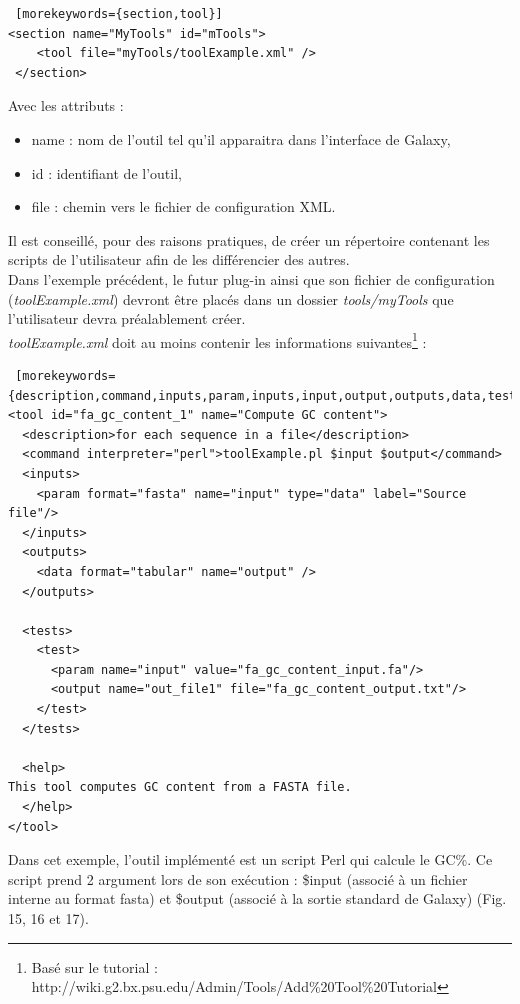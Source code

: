 \lstset{language=XML}
\begin{lstlisting} [morekeywords={section,tool}]
<section name="MyTools" id="mTools">
    <tool file="myTools/toolExample.xml" />
 </section>
 \end{lstlisting} 
 
Avec les attributs : 
\begin{itemize}
\item name : nom de l'outil tel qu'il apparaitra dans l'interface de Galaxy,
\item id : identifiant de l'outil,
\item file : chemin vers le fichier de configuration XML.\\
\end{itemize}

Il est conseillé, pour des raisons pratiques, de créer un répertoire contenant les scripts de l'utilisateur afin de les différencier des autres.\\ Dans l'exemple précédent, le futur plug-in ainsi que son fichier de configuration (\textit{toolExample.xml}) devront être placés dans un dossier \textit{tools/myTools} que l'utilisateur devra préalablement créer.\\

\newpage
\textit{toolExample.xml} doit au moins contenir les informations suivantes\footnote{Basé sur le tutorial : http://wiki.g2.bx.psu.edu/Admin/Tools/Add\%20Tool\%20Tutorial} : 

\lstset{language=XML}
\begin{lstlisting} [morekeywords={description,command,inputs,param,inputs,input,output,outputs,data,tests,test,help,tool}]
<tool id="fa_gc_content_1" name="Compute GC content">
  <description>for each sequence in a file</description>
  <command interpreter="perl">toolExample.pl $input $output</command>
  <inputs>
    <param format="fasta" name="input" type="data" label="Source file"/>
  </inputs>
  <outputs>
    <data format="tabular" name="output" />
  </outputs>

  <tests>
    <test>
      <param name="input" value="fa_gc_content_input.fa"/>
      <output name="out_file1" file="fa_gc_content_output.txt"/>
    </test>
  </tests>

  <help>
This tool computes GC content from a FASTA file.
  </help>
</tool>
 \end{lstlisting} 

Dans cet exemple, l'outil implémenté est un script Perl qui calcule le GC\%. Ce script prend 2 argument lors de son exécution : \$input (associé à un fichier interne au format fasta) et \$output (associé à la sortie standard de Galaxy) (Fig. 15, 16 et 17).\\




